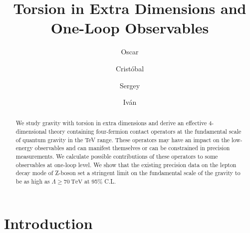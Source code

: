 \documentclass[twocolumn,showpacs,showkeys,prd,superscriptaddress]{revtex4-1}
\begin{document}
\title{Torsion in Extra Dimensions and One-Loop Observables}

\author{Oscar }

\author{Crist\'obal }

\author{Sergey }

\author{Iv\'an }

\begin{abstract}
  We study gravity with torsion in extra dimensions and derive an effective 4-dimensional theory containing four-fermion contact operators at the fundamental scale of quantum gravity in the TeV range. These operators may have an impact on the low-energy observables and can manifest themselves or can be constrained  in precision measurements.  We calculate possible contributions of these operators to some observables at one-loop level. We show that the existing precision data on the lepton decay mode of Z-boson set a stringent limit on the fundamental scale of the gravity to be as high as  $\Lambda\geq \SI{70}{\TeV}$ at 95\% C.L.
\end{abstract}

\maketitle


\section{Introduction}
\end{document}
